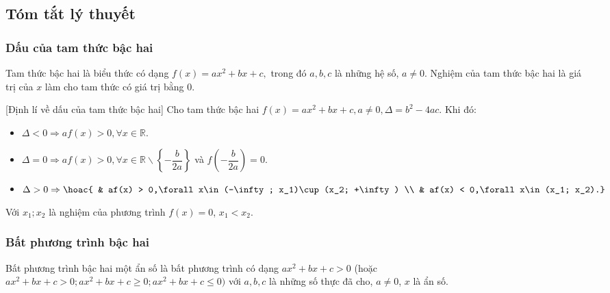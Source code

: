 \subsection{Tóm tắt lý thuyết}
	\subsubsection{Dấu của tam thức bậc hai}
	\begin{dn}{}
	Tam thức bậc hai là biểu thức có dạng $f(x) = ax^2 + bx + c,$ trong đó $a,b,c$ là những hệ số, $a\ne 0$. Nghiệm của tam thức bậc hai là giá trị của $x$ làm cho tam thức có giá trị bằng $0$.
	\end{dn}
	\begin{dl}{[Định lí về dấu của tam thức bậc hai]}
	Cho tam thức bậc hai $f(x) = ax^2 + bx + c,a\ne 0,\Delta = b^2 - 4ac$.
	Khi đó:
	\begin{itemize}
	\item $\Delta < 0\Rightarrow af(x) > 0,\forall x\in \mathbb{R}$.
	\item $ \Delta = 0\Rightarrow af(x) > 0,\forall x\in \mathbb{R}\backslash \left\{ - \dfrac{b}{2a}\right\} $ và $f\left(-\dfrac{b}{2a}\right)=0$.
	\item $ \Delta > 0\Rightarrow \hoac{
	& af(x) > 0,\forall x\in (-\infty; x_1)\cup (x_2; +\infty) \\ 
	& af(x) < 0,\forall x\in (x_1; x_2).}$
	\end{itemize}
	Với $x_1;x_2$ là nghiệm của phương trình $f(x) = 0$, $x_1 < x_2$.
	\end{dl}
	\subsubsection{Bất phương trình bậc hai}
	\begin{dn}{}
	Bất phương trình bậc hai một ẩn số là bất phương trình có dạng $ax^2 + bx + c > 0$ (hoặc $ax^2 + bx + c > 0; ax^2 + bx + c\ge 0; ax^2 + bx + c\le 0)$ với $a,b,c$ là những số thực đã cho, $a\ne 0$, $x$ là ẩn số.
	\end{dn}

